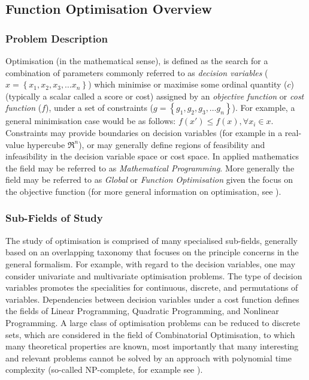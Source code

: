 %
%
\subsection{Function Optimisation Overview}
\label{subsec:iidle:function:optimization:overview}

%
%
\subsubsection{Problem Description}
Optimisation (in the mathematical sense), is defined as the search for a combination of parameters commonly referred to as \emph{decision variables} ($x = \left\{x_1, x_2, x_3, \ldots x_n\right\}$) which minimise or maximise some ordinal quantity ($c$) (typically a scalar  called a score or cost) assigned by an \emph{objective function} or \emph{cost function} ($f$), under a set of constraints ($g = \left\{g_1, g_2, g_3, \ldots g_n\right\}$). For example, a general minimisation case would be as follows: $f(x\prime) \leq f(x), \forall x_i \in x$. Constraints may provide boundaries on decision variables (for example in a real-value hypercube $\Re^n$), or may generally define regions of feasibility and infeasibility in the decision variable space or cost space. In applied mathematics the field may be referred to as \emph{Mathematical Programming}. More generally the field may be referred to as \emph{Global} or \emph{Function Optimisation} given the focus on the objective function (for more general information on optimisation, see \cite{Horst2000, Project1995, Boyd2004}). 

%
%
\subsubsection{Sub-Fields of Study}
The study of optimisation is comprised of many specialised sub-fields, generally based on an overlapping taxonomy that focuses on the principle concerns in the general formalism. 
For example, with regard to the decision variables, one may consider univariate and multivariate optimisation problems. The type of decision variables promotes the specialities for continuous, discrete, and permutations of variables. Dependencies between decision variables under a cost function defines the fields of Linear Programming, Quadratic Programming, and Nonlinear Programming. A large class of optimisation problems can be reduced to discrete sets, which are considered in the field of Combinatorial Optimisation, to which many theoretical properties are known, most importantly that many interesting and relevant problems cannot be solved by an approach with polynomial time complexity (so-called NP-complete, for example see \cite{Papadimitriou1998}).

